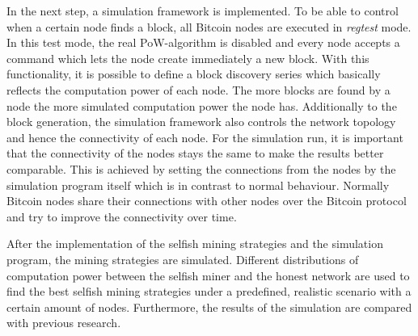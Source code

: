 In the next step, a simulation framework is implemented.
To be able to control when a certain node finds a block, all Bitcoin nodes are executed in \textit{regtest} mode.
In this test mode, the real PoW-algorithm is disabled and every node accepts a command which lets the node create immediately a new block.
With this functionality, it is possible to define a block discovery series which basically reflects the computation power of each node.
The more blocks are found by a node the more simulated computation power the node has.
Additionally to the block generation, the simulation framework also controls the network topology and hence the connectivity of each node.
For the simulation run, it is important that the connectivity of the nodes stays the same to make the results better comparable.
This is achieved by setting the connections from the nodes by the simulation program itself which is in contrast to normal behaviour.
Normally Bitcoin nodes share their connections with other nodes over the Bitcoin protocol and try to improve the connectivity over time.

After the implementation of the selfish mining strategies and the simulation program, the mining strategies are simulated.
Different distributions of computation power between the selfish miner and the honest network are used to find the best selfish mining strategies under a predefined, realistic scenario with a certain amount of nodes.
Furthermore, the results of the simulation are compared with previous research.
